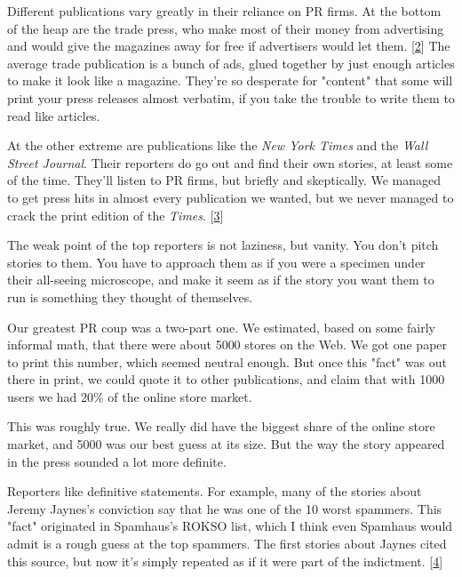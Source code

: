 Different
                  publications vary greatly in their reliance on PR firms. At
                  the bottom of the heap are the trade press, who make most of
                  their money from advertising and would give the magazines away
                  for free if advertisers would let them.
                  [\href{\#f2n}{2}]
                  The average trade publication is a bunch of ads, glued
                  together by just enough articles to make it look like a
                  magazine. They're so desperate for "content" that some will
                  print your press releases almost verbatim, if you take the
                  trouble to write them to read like articles.

At the
                  other extreme are publications like the
                  \emph{New York Times} and the \emph{Wall Street Journal}.
                  Their reporters do go out and find their own stories, at least
                  some of the time. They'll listen to PR firms, but briefly and
                  skeptically. We managed to get press hits in almost every
                  publication we wanted, but we never managed to crack the print
                  edition of the \emph{Times}.
                  [\href{\#f3n}{3}]

The weak point of the top reporters is not
                  laziness, but vanity. You don't pitch stories to them. You
                  have to approach them as if you were a specimen under their
                  all-seeing microscope, and make it seem as if the story you
                  want them to run is something they thought of themselves.

Our
                  greatest PR coup was a two-part one. We estimated, based on
                  some fairly informal math, that there were about 5000 stores
                  on the Web. We got one paper to print this number, which
                  seemed neutral enough. But once this "fact" was out there in
                  print, we could quote it to other publications, and claim that
                  with 1000 users we had 20\% of the online store market.

This
                  was roughly true. We really did have the biggest share of the
                  online store market, and 5000 was our best guess at its size.
                  But the way the story appeared in the press sounded a lot more
                  definite.

Reporters like definitive statements. For
                  example, many of the stories about Jeremy Jaynes's conviction
                  say that he was one of the 10 worst spammers. This "fact"
                  originated in Spamhaus's ROKSO list, which I think even
                  Spamhaus would admit is a rough guess at the top spammers. The
                  first stories about Jaynes cited this source, but now it's
                  simply repeated as if it were part of the indictment.
                  [\href{\#f4n}{4}]

